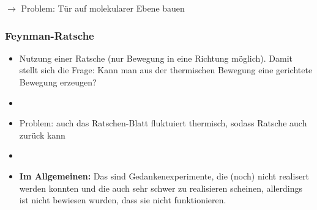 $\rightarrow$ Problem: Tür auf molekularer Ebene bauen

\subsubsection{Feynman-Ratsche}
\begin{itemize}
    \item[] Nutzung einer Ratsche (nur Bewegung in eine Richtung möglich). Damit stellt sich die Frage: Kann man aus der thermischen Bewegung eine gerichtete Bewegung erzeugen?
    \item[]
    \item[] Problem: auch das Ratschen-Blatt fluktuiert thermisch, sodass Ratsche auch zurück kann
    \item[]
    \item[] \textbf{Im Allgemeinen:} Das sind Gedankenexperimente, die (noch) nicht realisert werden konnten und die auch sehr schwer zu realisieren scheinen, allerdings ist nicht bewiesen wurden, dass sie nicht funktionieren.
\end{itemize}




